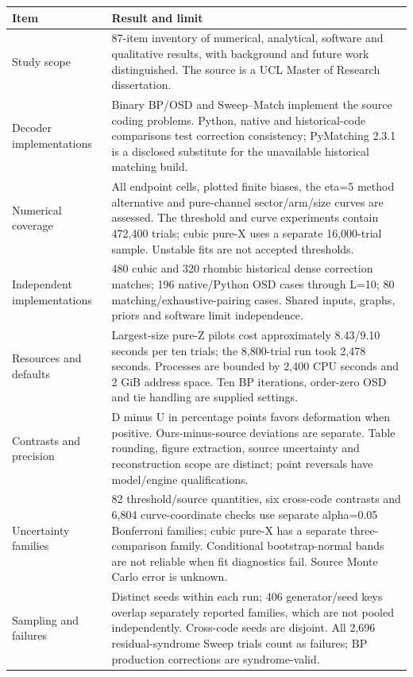 \begin{longtable}{p{.23\linewidth}p{.69\linewidth}}
\toprule Item & Result and limit\\\midrule\endhead
Study scope & 87-item inventory of numerical, analytical, software and qualitative results, with background and future work distinguished. The source is a UCL Master of Research dissertation.\\
Decoder implementations & Binary BP/OSD and Sweep--Match implement the source coding problems. Python, native and historical-code comparisons test correction consistency; PyMatching 2.3.1 is a disclosed substitute for the unavailable historical matching build.\\
Numerical coverage & All endpoint cells, plotted finite biases, the eta=5 method alternative and pure-channel sector/arm/size curves are assessed. The threshold and curve experiments contain 472,400 trials; cubic pure-X uses a separate 16,000-trial sample. Unstable fits are not accepted thresholds.\\
Independent implementations & 480 cubic and 320 rhombic historical dense correction matches; 196 native/Python OSD cases through L=10; 80 matching/exhaustive-pairing cases. Shared inputs, graphs, priors and software limit independence.\\
Resources and defaults & Largest-size pure-Z pilots cost approximately 8.43/9.10 seconds per ten trials; the 8,800-trial run took 2,478 seconds. Processes are bounded by 2,400 CPU seconds and 2 GiB address space. Ten BP iterations, order-zero OSD and tie handling are supplied settings.\\
Contrasts and precision & D minus U in percentage points favors deformation when positive. Ours-minus-source deviations are separate. Table rounding, figure extraction, source uncertainty and reconstruction scope are distinct; point reversals have model/engine qualifications.\\
Uncertainty families & 82 threshold/source quantities, six cross-code contrasts and 6,804 curve-coordinate checks use separate alpha=0.05 Bonferroni families; cubic pure-X has a separate three-comparison family. Conditional bootstrap-normal bands are not reliable when fit diagnostics fail. Source Monte Carlo error is unknown.\\
Sampling and failures & Distinct seeds within each run; 406 generator/seed keys overlap separately reported families, which are not pooled independently. Cross-code seeds are disjoint. All 2,696 residual-syndrome Sweep trials count as failures; BP production corrections are syndrome-valid.\\

\end{longtable}
